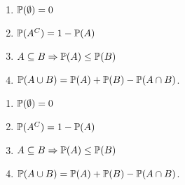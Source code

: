 \begin{note}
  \begin{field}
    \begin{thm}\leavevmode
      \begin{enumerate}
        \item $\P(\emptyset) = 0$
        \item $\P(A^C) = 1 - \P(A)$
        \item $A\subseteq B \Rightarrow \P(A) \leq \P(B)$
        \item $\P (A\cup B) = \P(A) + \P(B) - \P(A\cap B)$.
      \end{enumerate}
    \end{thm}
  \end{field}
  \begin{field}
    \begin{thm}\leavevmode
      \begin{enumerate}
        \item $\P(\emptyset) = 0$
        \item $\P(A^C) = 1 - \P(A)$
        \item $A\subseteq B \Rightarrow \P(A) \leq \P(B)$
        \item $\P (A\cup B) = \P(A) + \P(B) - \P(A\cap B)$.
      \end{enumerate}
    \end{thm}
  \end{field}
  \xplain{}%
\end{note}


